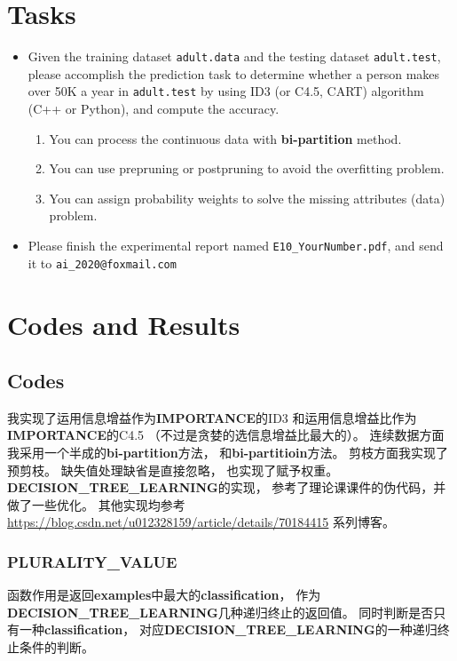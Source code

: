 \documentclass[a4paper, 11pt]{article}
\begin{document}
\section{Tasks}
\begin{itemize}
\item Given the training dataset \texttt{adult.data} and the testing dataset \texttt{adult.test}, please accomplish the prediction task to determine whether a person makes over 50K a year in \texttt{adult.test} by using ID3 (or C4.5, CART) algorithm (C++ or Python), and compute the accuracy. 
\begin{enumerate}
\item You can process the continuous data with \textbf{bi-partition} method.
\item You can use prepruning or postpruning to avoid the overfitting problem.
\item You can assign probability weights to solve the missing attributes (data) problem.
\end{enumerate}

\item Please finish the experimental report named \texttt{E10\_YourNumber.pdf}, and send it to \texttt{ai\_2020@foxmail.com}
\end{itemize}

\section{Codes and Results}
\subsection{Codes}
我实现了运用信息增益作为\textbf{IMPORTANCE}的ID3
和运用信息增益比作为\textbf{IMPORTANCE}的C4.5
（不过是贪婪的选信息增益比最大的）。
连续数据方面我采用一个半成的\textbf{bi-partition}方法，
和\textbf{bi-partitioin}方法。
剪枝方面我实现了预剪枝。
缺失值处理缺省是直接忽略，
也实现了赋予权重。
\textbf{DECISION\_TREE\_LEARNING}的实现，
参考了理论课课件的伪代码，并做了一些优化。
其他实现均参考
\url{https://blog.csdn.net/u012328159/article/details/70184415}
系列博客。

\subsubsection{PLURALITY\_VALUE}
函数作用是返回\textbf{examples}中最大的\textbf{classification}，
作为\textbf{DECISION\_TREE\_LEARNING}几种递归终止的返回值。
同时判断是否只有一种\textbf{classification}，
对应\textbf{DECISION\_TREE\_LEARNING}的一种递归终止条件的判断。
\end{document}
